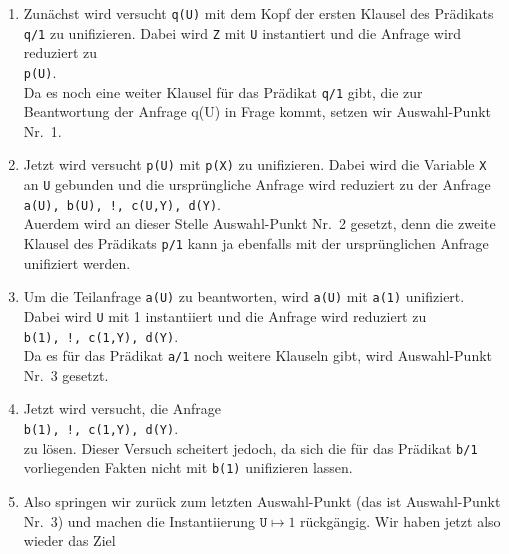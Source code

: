\begin{enumerate}
\item Zun\"{a}chst wird versucht \texttt{q(U)} mit dem Kopf der ersten Klausel 
      des Pr\"{a}dikats \texttt{q/1}  zu unifizieren.  Dabei wird \texttt{Z} mit
      \texttt{U} instantiert und die Anfrage wird reduziert zu \\[0.1cm]
      \hspace*{1.3cm} \texttt{p(U)}. \\[0.1cm]
      Da es noch eine weiter Klausel f\"{u}r das Pr\"{a}dikat \texttt{q/1} gibt, die zur
      Beantwortung der Anfrage q(U) in Frage kommt, setzen wir Auswahl-Punkt Nr.~1.
\item Jetzt wird versucht \texttt{p(U)} mit \texttt{p(X)} zu unifizieren.  Dabei
      wird die Variable \texttt{X} an \texttt{U} gebunden und die urspr\"{u}ngliche Anfrage
      wird reduziert zu der Anfrage \\[0.1cm]
      \hspace*{1.3cm}  
      \texttt{a(U), b(U), !, c(U,Y), d(Y)}. \\[0.1cm]
      Au\3erdem wird an dieser Stelle Auswahl-Punkt Nr.~2 gesetzt, denn die zweite Klausel
      des Pr\"{a}dikats \texttt{p/1} kann ja ebenfalls mit der urspr\"{u}nglichen Anfrage unifiziert
      werden. 
\item Um die Teilanfrage \texttt{a(U)} zu beantworten, wird \texttt{a(U)} mit
      \texttt{a(1)} unifiziert.  Dabei wird \texttt{U} mit 1 instantiiert und die Anfrage wird reduziert zu \\[0.1cm]
      \hspace*{1.3cm} 
      \texttt{b(1), !, c(1,Y), d(Y)}. \\[0.1cm]
      Da es f\"{u}r das Pr\"{a}dikat \texttt{a/1} noch weitere Klauseln gibt, wird Auswahl-Punkt Nr.~3
      gesetzt.
\item Jetzt wird versucht, die Anfrage \\[0.1cm]
      \hspace*{1.3cm}    \texttt{b(1), !, c(1,Y), d(Y)}. \\[0.1cm]
      zu l\"{o}sen.  Dieser Versuch scheitert jedoch, da sich die f\"{u}r das Pr\"{a}dikat \texttt{b/1}
      vorliegenden Fakten nicht mit \texttt{b(1)} unifizieren lassen.
\item Also springen wir zur\"{u}ck zum letzten Auswahl-Punkt (das ist Auswahl-Punkt Nr.~3)
      und machen die Instantiierung 
      $\texttt{U} \mapsto 1$ r\"{u}ckg\"{a}ngig.  Wir haben jetzt also wieder das Ziel \\[0.1cm]

\end{enumerate}
